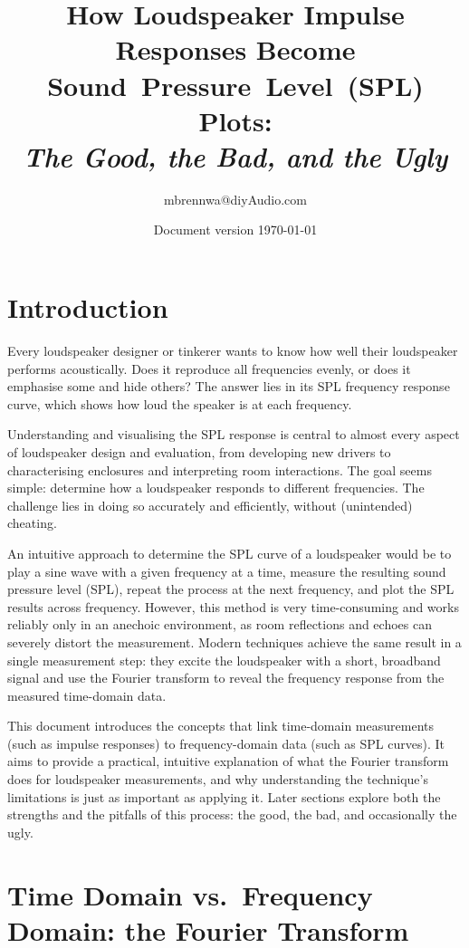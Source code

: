 \documentclass[12pt,a4paper]{article}
\title{How Loudspeaker Impulse Responses Become Sound~Pressure~Level~(SPL) Plots:\\[0.7em]\textit{The Good, the Bad, and the Ugly}}
\author{mbrennwa@diyAudio.com}
\date{Document version \today}
\providecommand{\seclabel}[1]{\label{sec:#1}}
\begin{document}
\maketitle

\section{Introduction}

Every loudspeaker designer or tinkerer wants to know how well their loudspeaker performs acoustically. Does it reproduce all frequencies evenly, or does it emphasise some and hide others? The answer lies in its SPL frequency response curve, which shows how loud the speaker is at each frequency.

Understanding and visualising the SPL response is central to almost every aspect of loudspeaker design and evaluation, from developing new drivers to characterising enclosures and interpreting room interactions. The goal seems simple: determine how a loudspeaker responds to different frequencies. The challenge lies in doing so accurately and efficiently, without (unintended) cheating.

An intuitive approach to determine the SPL curve of a loudspeaker would be to play a sine wave with a given frequency at a time, measure the resulting sound pressure level (SPL), repeat the process at the next frequency, and plot the SPL results across frequency. However, this method is very time-consuming and works reliably only in an anechoic environment, as room reflections and echoes can severely distort the measurement. Modern techniques achieve the same result in a single measurement step: they excite the loudspeaker with a short, broadband signal and use the Fourier transform to reveal the frequency response from the measured time-domain data.

This document introduces the concepts that link time-domain measurements (such as impulse responses) to frequency-domain data (such as SPL curves). It aims to provide a practical, intuitive explanation of what the Fourier transform does for loudspeaker measurements, and why understanding the technique's limitations is just as important as applying it. Later sections explore both the strengths and the pitfalls of this process: the good, the bad, and occasionally the ugly.


\section{Time Domain vs.\ Frequency Domain: the Fourier Transform}\seclabel{Fourier_Theory}
\end{document}
